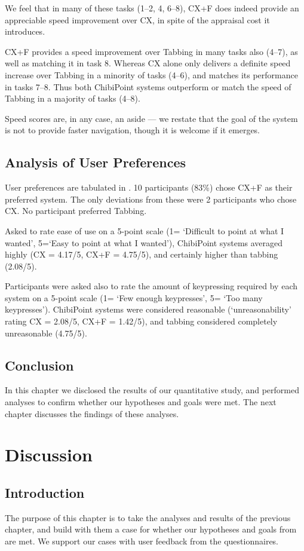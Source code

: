 \documentclass[11pt,openright,a4paper]{report}
\begin{document}
We feel that in many of these tasks (1--2, 4, 6--8), CX+F does indeed provide an appreciable speed improvement over CX, in spite of the appraisal cost it introduces.

CX+F provides a speed improvement over Tabbing in many tasks also (4--7), as well as matching it in task 8. Whereas CX alone only delivers a definite speed increase over Tabbing in a minority of tasks (4--6), and matches its performance in tasks 7--8. Thus both ChibiPoint systems outperform or match the speed of Tabbing in a majority of tasks (4--8).

Speed scores are, in any case, an aside --- we restate that the goal of the system is not to provide faster navigation, though it is welcome if it emerges.

\section{Analysis of User Preferences}
\label{sec:userpref}
User preferences are tabulated in . 10 participants (83\%) chose CX+F as their preferred system. The only deviations from these were 2 participants who chose CX. No participant preferred Tabbing.

Asked to rate ease of use on a 5-point scale (1= `Difficult to point at what I wanted', 5=`Easy to point at what I wanted'), ChibiPoint systems averaged highly (CX = 4.17/5, CX+F = 4.75/5), and certainly higher than tabbing (2.08/5).

Participants were asked also to rate the amount of keypressing required by each system on a 5-point scale (1= `Few enough keypresses', 5= `Too many keypresses'). ChibiPoint systems were considered reasonable (`unreasonability' rating CX = 2.08/5, CX+F = 1.42/5), and tabbing considered completely unreasonable (4.75/5).

\section{Conclusion}
In this chapter we disclosed the results of our quantitative study, and performed analyses to confirm whether our hypotheses and goals were met. The next chapter discusses the findings of these analyses.

\chapter{Discussion}
\label{chap:discussion}
\section{Introduction}
The purpose of this chapter is to take the analyses and results of the previous chapter, and build with them a case for whether our hypotheses and goals from  are met. We support our cases with user feedback from the questionnaires.
\end{document}

